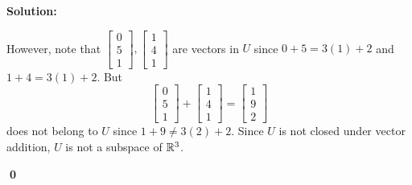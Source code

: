 \documentclass{article}
\newenvironment{solution}
{
  \ignorespaces
  \textbf{Solution:}
}
{
  \ignorespacesafterend
  \begin{flushright}
  {\bfseries \qed}
  \end{flushright}
}
\begin{document}
\begin{solution}
However, note that
\(
  \begin{bmatrix} 0 \\ 5 \\ 1 \end{bmatrix},
  \begin{bmatrix} 1 \\ 4 \\ 1 \end{bmatrix}
\)
are vectors in \(U\) since \(0+5=3(1)+2\) and \(1+4=3(1)+2\).
But
\[
  \begin{bmatrix} 0 \\ 5 \\ 1 \end{bmatrix}
    +
  \begin{bmatrix} 1 \\ 4 \\ 1 \end{bmatrix}
    =
  \begin{bmatrix} 1 \\ 9 \\ 2 \end{bmatrix}
\]
does not belong to \(U\) since \(1+9\not=3(2)+2\).
Since \(U\) is not closed under vector addition, \(U\) is not a subspace
of \(\mathbb{R}^3\).
\end{solution}
\end{document}
